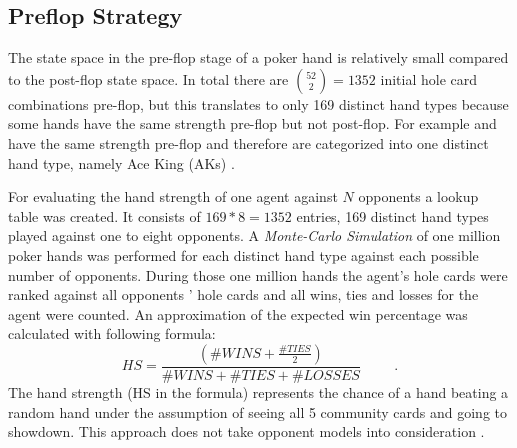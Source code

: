 \subsection{Preflop Strategy}
The state space in the pre-flop stage of a poker hand is relatively small compared to the post-flop state space. In total there are ${52\choose 2} = 1352$ initial hole card combinations pre-flop, but this translates to only 169 distinct hand types because some hands have the same strength pre-flop but not post-flop. For example \Ah\Kh and \Ad\Kd have the same strength pre-flop and therefore are categorized into one distinct hand type, namely Ace King  (AKs) \cite{opp_master}. \par
For evaluating the hand strength of one agent against $N$ opponents a lookup table was created. It consists of $169 * 8 = 1352$ entries, 169 distinct hand types played against one to eight opponents. A \textit{Monte-Carlo Simulation} of one million poker hands was performed for each distinct hand type against each possible number of opponents. During those one million hands the agent's hole cards were ranked against all opponents ' hole cards and all wins, ties and losses for the agent were counted. An approximation of the expected win percentage was calculated with following formula:
\begin{equation}
\label{eq:hs}
HS =  \frac{(\#WINS + \frac{\#TIES}{2})}{\#WINS + \#TIES + \#LOSSES} \hspace{1cm} .
\end{equation}
The hand strength (HS in the formula) represents the chance of a hand beating a random hand under the assumption of seeing all 5 community cards and going to showdown. This approach does not take opponent models into consideration \cite{opp_master}. \par
